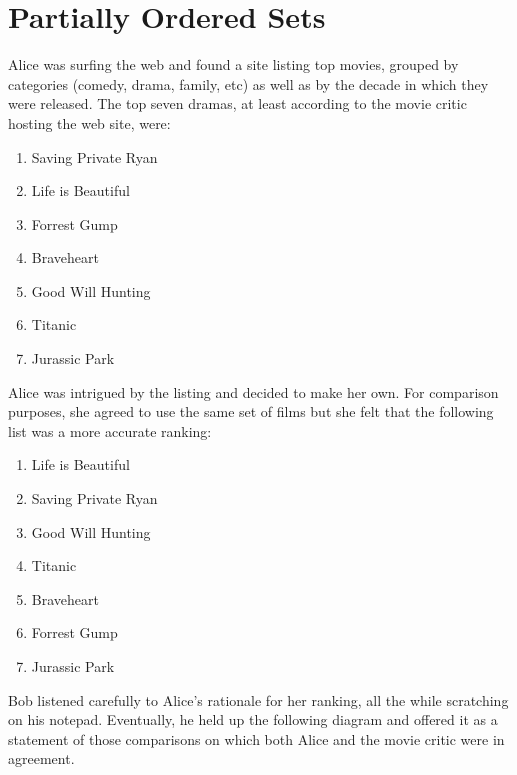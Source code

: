 \chapter{Partially Ordered Sets}\label{ch:posets}

Alice was surfing the web and found a site listing top movies, grouped
by categories (comedy, drama, family, etc) as well as by the decade in 
which they were released.  The top seven dramas,
at least according to the movie critic hosting the web site, were:

\begin{enumerate}
\item Saving Private Ryan 
\item Life is Beautiful 
\item Forrest Gump
\item Braveheart
\item Good Will Hunting
\item Titanic
\item Jurassic Park
\end{enumerate}

Alice was intrigued by the listing and decided to make her own.
For comparison purposes, she agreed to use the same set of films
but she felt that the following list was a more accurate ranking:

\begin{enumerate}
\item Life is Beautiful 
\item Saving Private Ryan 
\item Good Will Hunting
\item Titanic
\item Braveheart
\item Forrest Gump
\item Jurassic Park
\end{enumerate}

Bob listened carefully to Alice's rationale for her ranking, all the
while scratching on his notepad.  Eventually, he held up the following
diagram and offered it as a statement of those comparisons on which both Alice
and the movie critic were in agreement. 

